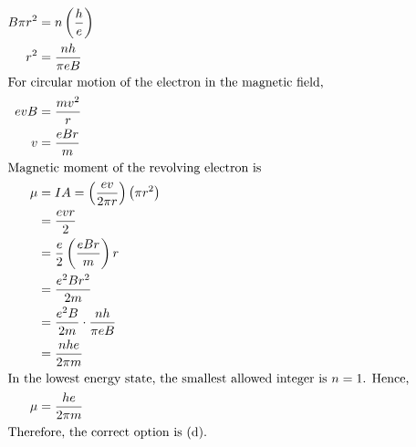 \begin{solution}
\begin{align*}
B\pi r^2 &= n\left(\frac{h}{e}\right) \\
r^2 &= \frac{nh}{\pi eB} \\
\intertext{For circular motion of the electron in the magnetic field,}
e v B &= \frac{mv^2}{r} \\
v &= \frac{eBr}{m} \\
\intertext{Magnetic moment of the revolving electron is}
\mu &= IA = \left(\frac{ev}{2\pi r}\right)\left(\pi r^2\right) \\
      &= \frac{evr}{2} \\
      &= \frac{e}{2}\left(\frac{eBr}{m}\right)r \\
      &= \frac{e^2Br^2}{2m} \\
      &= \frac{e^2B}{2m}\cdot \frac{nh}{\pi eB} \\
      &= \frac{nhe}{2\pi m} \\
\intertext{In the lowest energy state, the smallest allowed integer is $n = 1$. Hence,}
\mu &= \frac{he}{2\pi m} \\
\intertext{Therefore, the correct option is (d).}
\end{align*}
\end{solution}
